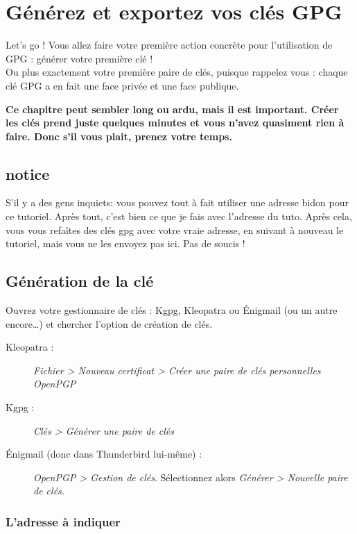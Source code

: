 \chapter{Générez et exportez vos clés GPG}

Let's go ! Vous allez faire votre première action concrète pour
l'utilisation de GPG : générer votre première clé !\\Ou plus exactement
votre première paire de clés, puisque rappelez vous : chaque clé GPG a
en fait une face privée et une face publique.

\textbf{Ce chapitre peut sembler long ou ardu, mais il est important.
Créer les clés prend juste quelques minutes et vous n'avez quasiment
rien à faire. Donc s'il vous plait, prenez votre temps.}

\section{notice}\label{notice}
S'il y a des gens inquiets: vous pouvez tout à fait utiliser une adresse
bidon pour ce tutoriel. Après tout, c'est bien ce que je fais avec
l'adresse du tuto. Après cela, vous vous refaîtes des clés gpg avec votre vraie adresse, en
suivant à nouveau le tutoriel, mais vous ne les envoyez pas ici. Pas de
soucis !

\section{Génération de la clé}\label{guxe9nuxe9ration-de-la-cluxe9}

Ouvrez votre gestionnaire de clés : Kgpg, Kleopatra ou Énigmail (ou un
autre encore\ldots{}) et chercher l'option de création de clés.

\begin{description}
	\item [Kleopatra :] \emph{Fichier \textgreater{} Nouveau certificat \textgreater{} Créer une paire de clés personnelles	OpenPGP}
	\item [Kgpg :] \emph{Clés \textgreater{} Générer une paire de clés}
	\item [Énigmail (donc dans Thunderbird lui-même) :] \emph{OpenPGP \textgreater{} Gestion de clés}. Sélectionnez alors \emph{Générer \textgreater{} Nouvelle paire de clés.}	
\end{description}


\subsection{L'adresse à indiquer}\label{ladresse-uxe0-indiquer}

